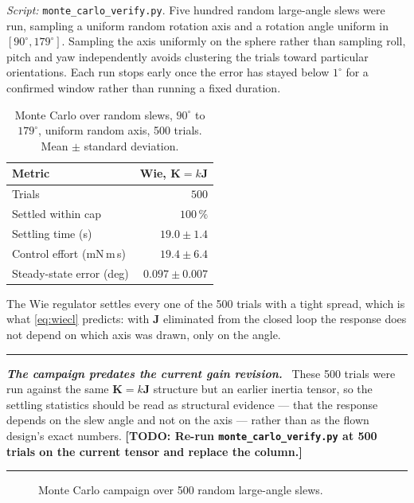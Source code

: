 \documentclass[conference,10pt,a4paper]{IEEEtran}
\newcommand{\remarkrule}{\par\nobreak\vspace{2pt}%
  \hrule height 0.4pt\vspace{4pt}\nobreak}
\newenvironment{cautionbox}[1][Caveat]
  {\par\medskip\remarkrule\noindent\small\textbf{\textit{#1.}}\ \ignorespaces}
  {\par\vspace{3pt}\hrule height 0.4pt\par\medskip\ignorespacesafterend}
\newif\ifdraftmode
\newcommand{\TODO}[1]{\textbf{[TODO: #1]}}
\newcommand{\TODO}[1]{}
\newcommand{\figplaceholder}[2]{%
  \ifdraftmode
    \setlength{\fboxsep}{4pt}%
    \fbox{%
      \parbox[c][#1][c]{\dimexpr\linewidth-2\fboxsep-2\fboxrule\relax}{%
        \centering\scriptsize\textsc{figure placeholder}\\[3pt]
        \itshape #2}}%
  \else
    \parbox[c][#1][c]{\linewidth}{}%
  \fi}
\newcommand{\mat}[1]{\bm{#1}}
\begin{document}
\textit{Script:} \texttt{monte\_carlo\_verify.py}. Five hundred random
large-angle slews were run, sampling a uniform random rotation axis and a
rotation angle uniform in $[90^\circ,179^\circ]$. Sampling the axis uniformly
on the sphere rather than sampling roll, pitch and yaw independently avoids
clustering the trials toward particular orientations. Each run stops early once
the error has stayed below $1^\circ$ for a confirmed window rather than running
a fixed duration.

\begin{table}[!t]
\centering
\caption{Monte Carlo over random slews, $90^\circ$ to $179^\circ$, uniform
random axis, 500 trials. Mean $\pm$ standard deviation.}
\label{tab:montecarlo}
\footnotesize
\begin{tabular}{@{}lr@{}}
\toprule
\textbf{Metric} & \textbf{Wie, $\mat{K}=k\mat{J}$} \\
\midrule
Trials                    & $500$ \\
Settled within cap        & $100\,\%$ \\
Settling time (s)         & $19.0\pm1.4$ \\
Control effort (mN\,m\,s) & $19.4\pm6.4$ \\
Steady-state error (deg)  & $0.097\pm0.007$ \\
\bottomrule
\end{tabular}
\end{table}

The Wie regulator settles every one of the 500 trials with a tight spread,
which is what \cref{eq:wiecl} predicts: with $\mat{J}$ eliminated from the
closed loop the response does not depend on which axis was drawn, only on the
angle.

\begin{cautionbox}[The campaign predates the current gain revision]
These 500 trials were run against the same $\mat{K}=k\mat{J}$ structure but an
earlier inertia tensor, so the settling statistics should be read as
structural evidence --- that the response depends on the slew angle and not on
the axis --- rather than as the flown design's exact numbers. \TODO{Re-run
\texttt{monte\_carlo\_verify.py} at 500 trials on the current tensor and replace
the column.}
\end{cautionbox}

\begin{figure}[!t]
\centering
\figplaceholder{46mm}{Settling time, control effort and steady-state error
against trial index for each controller, with mean and $\pm1\sigma$ bands, plus
the same metrics against slew angle. Generated by
\texttt{studies/monte\_carlo\_analysis.ipynb}.}
\caption{Monte Carlo campaign over 500 random large-angle slews.}
\label{fig:montecarlo}
\end{figure}
\end{document}
